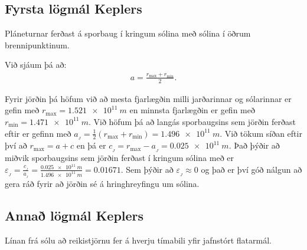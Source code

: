 \subsection*{Fyrsta lögmál Keplers}

\begin{tcolorbox}
\begin{theorem}
Pláneturnar ferðast á sporbaug í kringum sólina með sólina í öðrum brennipunktinum.
\end{theorem}
\end{tcolorbox}

Við sjáum þá að:
\begin{align*}
    a = \frac{r_{\text{max}}+ r_{\text{min}}}{2}.
\end{align*}


Fyrir jörðin þá höfum við að mesta fjarlægðin milli jarðarinnar og sólarinnar er gefin með $r_{\text{max}} = \SI{1.521e11}{m}$ en minnsta fjarlægðin er gefin með $r_{\text{min}} = \SI{1.471e11}{m}$. Við höfum þá að langás sporbaugsins sem jörðin ferðast eftir er gefinn með $a_{_{J}} = \frac{1}{2}(r_{\text{max}} + r_{\text{min}}) = \SI{1.496e11}{m}$. Við tökum síðan eftir því að $r_{\text{max}} = a + c$ en þá er $c_{_{J}} = r_{\text{max}} - a_{_{J}} = \SI{0.025e11}{m}$. Það þýðir að miðvik sporbaugsins sem jörðin ferðast í kringum sólina með er $\varepsilon_{_{J}} = \frac{c_{_{J}}}{a_{_{J}}} = \frac{\SI{0.025e11}{m}}{\SI{1.496e11}{m}} = 0.01671$.
Sem þýðir að $\varepsilon_{_J} \approx 0$ og það er því góð nálgun að gera ráð fyrir að jörðin sé á hringhreyfingu um sólina.

\subsection*{Annað lögmál Keplers}

\begin{tcolorbox}
\begin{theorem}
Línan frá sólu að reikistjörnu fer á hverju tímabili yfir jafnstórt flatarmál.
\end{theorem}
\end{tcolorbox}

